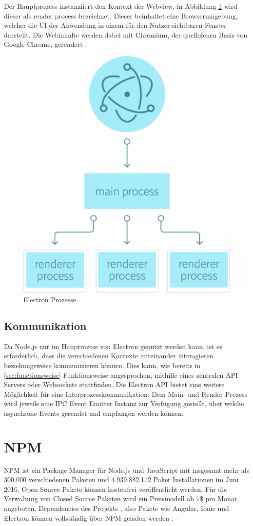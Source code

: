 Der Hauptprozess instanziiert den Kontext der Webview, in Abbildung \ref{fig:electronprozess} wird dieser als render process bezeichnet.
Dieser beinhaltet eine Browserumgebung, welcher die \ac{UI} der Anwendung in einem für den Nutzer sichtbaren Fenster darstellt.
Die Webinhalte werden dabei mit Chromium, der quellofenen Basis von Google Chrome, gerendert \cite{Build58:online}.

\begin{figure}[htbp]
 \centering
 \includegraphics[width=0.4\linewidth]{kapitel3/electron-context.png}
 \caption{Electron Prozesse \cite{Build58:online}}
\label{fig:electronprozess}
\end{figure}


\subsection{Kommunikation}
\label{sec:Kommunikation}

Da Node.js nur im Hauptrozess von Electron genutzt werden kann, ist es erforderlich,
dass die verschiedenen Kontexte miteinander interagieren beziehungsweise kommunizieren können.
Dies kann, wie bereits in \ref{sec:functionsweise} Funktionsweise angesprochen,
mithilfe eines zentralen API Servers oder Websockets stattfinden.
Die Electron API bietet eine weitere Möglichkeit für eine Interprozesskommunikation.
Dem Main- und Render Prozess wird jeweils eine IPC Event Emitter Instanz zur Verfügung gestellt,
über welche asynchrone Events gesendet und empfangen werden können.

\section{\ac{NPM}}

\ac{NPM} ist ein Package Manager für Node.js und JavaScript mit insgesamt mehr als 300.000 verschiedenen Paketen und
4.939.882.172 Paket Installationen im Juni 2016.
Open Source Pakete können kostenfrei veröffentlicht werden.
Für die Verwaltung von Closed Source Paketen wird ein Preismodell ab 7\$ pro Monat angeboten.
Dependencies des Projekts \projectname{}, also Pakete wie Angular, Ionic und Electron können vollständig
über \ac{NPM} geladen werden \cite{npm31:online}.

